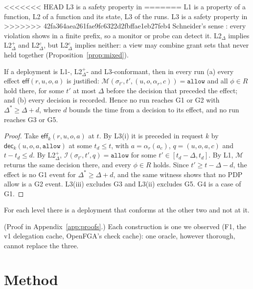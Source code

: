 \documentclass[sigconf,review,anonymous]{acmart}
\newcommand{\allowv}{\mathtt{allow}}
\newcommand{\ev}[1]{\mathsf{#1}}
\begin{document}
<<<<<<< HEAD
L3 is a safety property in
=======
L1 is a property of a function, L2 of a function and its state, L3 of the runs. L3 is a safety property in
>>>>>>> 42fa364aea261fae9fc6322d2fbffae1eb27feb4
Schneider's sense \cite{schneider2000enforceable}: every violation shows in a finite prefix, so a monitor or probe
can detect it. L2$_\Delta$ implies L2$^+_\Delta$ and L2$^c_\Delta$, but L2$^c_\Delta$ implies neither: a view may
combine grant sets that never held together (Proposition~\ref{prop:mixed}).

\begin{theorem}[Composition]\label{thm:compose}
If a deployment is L1-, L2$^+_\Delta$- and L3-conformant, then in every run (a) every effect $\ev{eff}(r,u,o,a)$ is
justified: $\mathcal{M}(\sigma_{t'},t',(u,o,\alpha_r,c))=\allowv$ and all $\phi\in R$ hold there, for some $t'$ at
most $\Delta$ before the decision that preceded the effect; and (b) every decision is recorded. Hence no run
reaches G1 or G2 with $\Delta^\ast\ge\Delta+d$, where $d$ bounds the time from a decision to its effect, and no
run reaches G3 or G5.
\end{theorem}
\begin{proof}
Take $\ev{eff}_k(r,u,o,a)$ at $t$. By L3(i) it is preceded in request $k$ by $\ev{dec}_k(u,o,a,\allowv)$ at some
$t_d\le t$, with $a=\alpha_r(a_c)$, $q=(u,o,a,c)$ and $t-t_d\le d$. By L2$^+_\Delta$,
$\mathcal{I}(\sigma_{t'},t',q)=\allowv$ for some $t'\in[t_d-\Delta,t_d]$. By L1, $\mathcal{M}$ returns the same
decision there, and every $\phi\in R$ holds. Since $t'\ge t-\Delta-d$, the effect is no G1 event for
$\Delta^\ast\ge\Delta+d$, and the same witness shows that no PDP allow is a G2 event. L3(iii) excludes G3 and L3(ii)
excludes G5. G4 is a case of G1.
\end{proof}

\begin{proposition}[Independence]\label{prop:indep}
For each level there is a deployment that conforms at the other two and not at it.
\end{proposition}
(Proof in Appendix~\ref{app:proofs}.)
Each construction is one we observed (F1, the v1 delegation cache, OpenFGA's check cache): one
oracle, however thorough, cannot replace the three.

\section{Method}
\label{sec:method}
\end{document}
